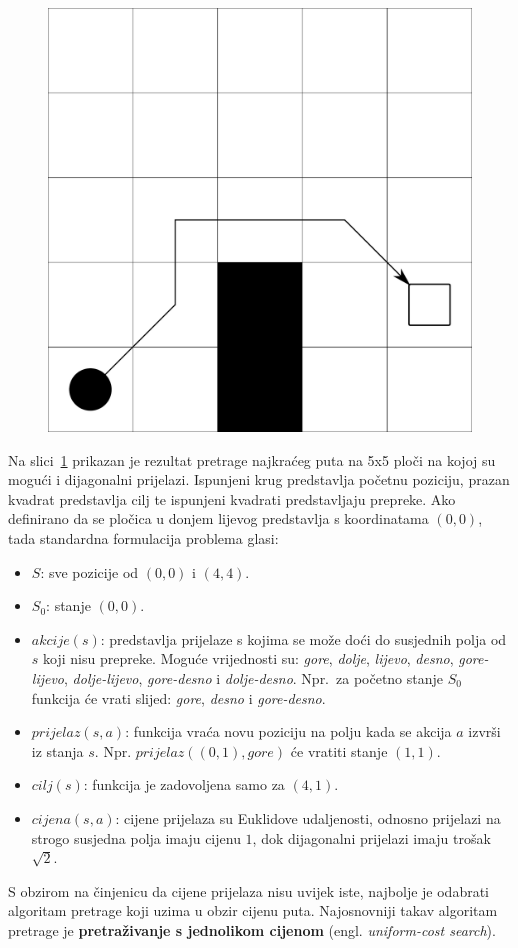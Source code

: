 \documentclass[times, utf8, zavrsni, numeric]{fer}
\begin{document}
\begin{figure}[h] 
	\centering
	\includegraphics[width=0.3\linewidth]{images/basicGrid.pdf}
	\caption{}
	\label{fig:basicGrid}
\end{figure} 

Na slici~\ref{fig:basicGrid} prikazan je rezultat pretrage najkraćeg puta na 5x5 ploči na kojoj su mogući i dijagonalni prijelazi.
Ispunjeni krug predstavlja početnu poziciju, prazan kvadrat predstavlja cilj te ispunjeni kvadrati predstavljaju prepreke.
Ako definirano da se pločica u donjem lijevog predstavlja s koordinatama \((0, 0)\), tada standardna formulacija problema glasi:
\begin{itemize}
    \item \(S\): sve pozicije od \((0, 0)\) i \((4, 4)\).
    \item \(S_0\): stanje \((0, 0)\).
    \item \(akcije(s)\): predstavlja prijelaze s kojima se može doći do susjednih polja od \(s\) koji nisu prepreke. 
    Moguće vrijednosti su: \textit{gore}, \textit{dolje}, \textit{lijevo}, \textit{desno}, \textit{gore-lijevo}, \textit{dolje-lijevo}, \textit{gore-desno} i \textit{dolje-desno}. 
    Npr.\ za početno stanje \(S_0\) funkcija će vrati slijed: \textit{gore}, \textit{desno} i \textit{gore-desno}. 
    \item \(prijelaz(s, a)\): funkcija vraća novu poziciju na polju kada se akcija \(a\) izvrši iz stanja \(s\). Npr. \(prijelaz((0, 1), gore)\) će vratiti stanje \((1, 1)\).
    \item \(cilj(s)\): funkcija je zadovoljena samo za \((4, 1)\).
    \item \(cijena(s, a)\): cijene prijelaza su Euklidove udaljenosti, odnosno prijelazi na strogo susjedna polja imaju cijenu \(1\), dok dijagonalni prijelazi imaju trošak \(\sqrt{2}\).
\end{itemize}

\par S obzirom na činjenicu da cijene prijelaza nisu uvijek iste, najbolje je odabrati algoritam pretrage koji uzima u obzir cijenu puta.
Najosnovniji takav algoritam pretrage je \textbf{pretraživanje s jednolikom cijenom} (engl. \textit{uniform-cost search}).
\end{document}
